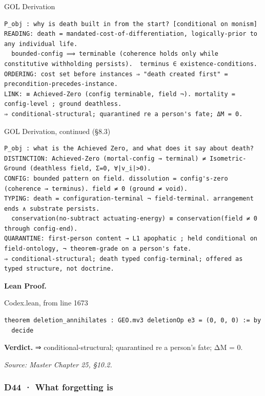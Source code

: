 \documentclass[10pt,twocolumn]{article}
\begin{document}
\begin{golbox}{GOL Derivation}
\begin{lstlisting}[style=golv]
P_obj : why is death built in from the start? [conditional on monism]
READING: death = mandated-cost-of-differentiation, logically-prior to any individual life.
  bounded-config ⟹ terminable (coherence holds only while constitutive withholding persists).  terminus ∈ existence-conditions.
ORDERING: cost set before instances ⇒ "death created first" = precondition-precedes-instance.
LINK: ≡ Achieved-Zero (config terminable, field ¬). mortality = config-level ; ground deathless.
⇒ conditional-structural; quarantined re a person's fate; ΔM = 0.
\end{lstlisting}
\end{golbox}

\begin{golbox}{GOL Derivation, continued (§8.3)}
\begin{lstlisting}[style=golv]
P_obj : what is the Achieved Zero, and what does it say about death?
DISTINCTION: Achieved-Zero (mortal-config → terminal) ≠ Isometric-Ground (deathless field, Σ=0, ∀|v_i|>0).
CONFIG: bounded pattern on field. dissolution = config's-zero (coherence → terminus). field ≠ 0 (ground ≠ void).
TYPING: death = configuration-terminal ¬ field-terminal. arrangement ends ∧ substrate persists.
  conservation(no-subtract actuating-energy) ≡ conservation(field ≠ 0 through config-end).
QUARANTINE: first-person content → L1 apophatic ; held conditional on field-ontology, ¬ theorem-grade on a person's fate.
⇒ conditional-structural; death typed config-terminal; offered as typed structure, not doctrine.
\end{lstlisting}
\end{golbox}

\textbf{Lean Proof.}

\begin{leanexcerpt}{Codex.lean, from line 1673}
\begin{lstlisting}[style=leanx,firstnumber=1673]
theorem deletion_annihilates : GEO.mv3 deletionOp e3 = (0, 0, 0) := by
  decide
\end{lstlisting}
\end{leanexcerpt}

\textbf{Verdict.} ⇒ conditional-structural; quarantined re a person's
fate; ΔM = 0.

\emph{Source: Master Chapter 25, §10.2.}

\hypertarget{d44-what-forgetting-is}{%
\subsubsection{D44 · What forgetting is}\label{d44-what-forgetting-is}}
\end{document}
